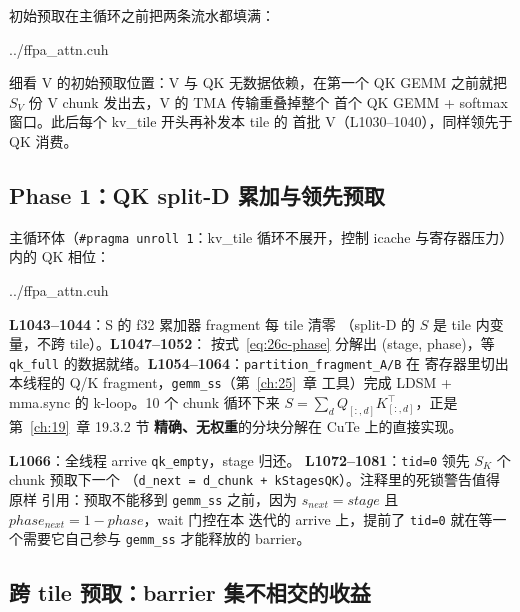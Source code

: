 初始预取在主循环之前把两条流水都填满：

\begin{lstinputlisting}[linerange={1008-1026},firstnumber=auto,
  title={ffpa\_attn.cuh L1008-1026（初始预取：QK 填满 $S_K$，V 填满 $S_V$）}]{../ffpa_attn.cuh}
\end{lstinputlisting}

细看 V 的初始预取位置：V 与 QK 无数据依赖，在第一个
QK GEMM 之前就把 $S_V$ 份 V chunk 发出去，V 的 TMA 传输重叠掉整个
首个 QK GEMM + softmax 窗口。此后每个 kv\_tile 开头再补发本 tile 的
首批 V（L1030--1040），同样领先于 QK 消费。

\subsection{Phase 1：QK split-D 累加与领先预取}\label{sec:26c-qk}

主循环体（\texttt{\#pragma unroll 1}：kv\_tile 循环不展开，控制
icache 与寄存器压力）内的 QK 相位：

\begin{lstinputlisting}[linerange={1043-1082},firstnumber=auto,
  title={ffpa\_attn.cuh L1043-1082（Phase 1：chunk 流水上的 $S=\sum_d Q_d K_d^\top$）}]{../ffpa_attn.cuh}
\end{lstinputlisting}

\textbf{L1043--1044}：S 的 f32 累加器 fragment 每 tile 清零
（split-D 的 $S$ 是 tile 内变量，不跨 tile）。\textbf{L1047--1052}：
按式~\eqref{eq:26c-phase} 分解出 (stage, phase)，等 \texttt{qk\_full}
的数据就绪。\textbf{L1054--1064}：\texttt{partition\_fragment\_A/B} 在
寄存器里切出本线程的 Q/K fragment，\texttt{gemm\_ss}（第~\ref{ch:25}~章
工具）完成 LDSM + mma.sync 的 k-loop。10 个 chunk 循环下来
$S = \sum_{d} Q_{[:,d]} K_{[:,d]}^\top$，正是第~\ref{ch:19}~章 19.3.2 节
\textbf{精确、无权重}的分块分解在 CuTe 上的直接实现。

\textbf{L1066}：全线程 arrive \texttt{qk\_empty}，stage 归还。
\textbf{L1072--1081}：\texttt{tid=0} 领先 $S_K$ 个 chunk 预取下一个
（\texttt{d\_next = d\_chunk + kStagesQK}）。注释里的死锁警告值得原样
引用：预取不能移到 \texttt{gemm\_ss} 之前，因为
$s_{next} = stage$ 且 $phase_{next} = 1 - phase$，wait 门控在本
迭代的 arrive 上，提前了 \texttt{tid=0} 就在等一个需要它自己参与
\texttt{gemm\_ss} 才能释放的 barrier。

\subsection{跨 tile 预取：barrier 集不相交的收益}\label{sec:26c-prefetch}

